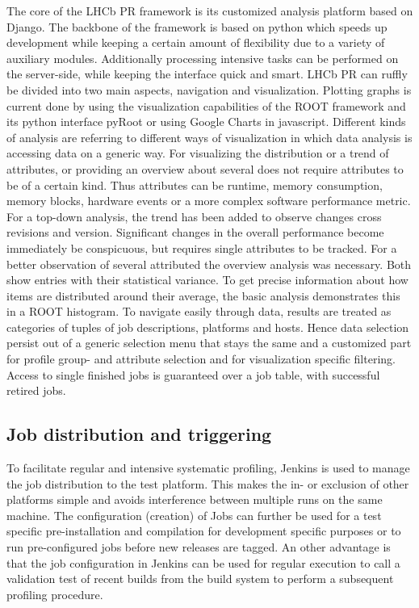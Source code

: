 \documentclass[a4paper]{jpconf}
\begin{document}
The core of the LHCb PR framework is its customized analysis platform based on Django. The backbone of the framework is based on python which speeds up development while keeping a certain amount of flexibility due to a variety of auxiliary modules. Additionally processing intensive tasks can be performed on the server-side, while keeping the interface quick and smart.
\newline
LHCb PR can ruffly be divided into two main aspects, navigation and visualization. Plotting graphs is current done by using the visualization capabilities of the ROOT framework and its python interface pyRoot or using Google Charts in javascript. Different kinds of analysis are referring to different ways of visualization in which data analysis is accessing data on a generic way. For visualizing the distribution or a trend of attributes, or providing an overview about several does not require attributes to be of a certain kind. Thus attributes can be runtime, memory consumption, memory blocks, hardware events or a more complex software performance metric.
\newline
For a top-down analysis, the trend has been added to observe changes cross revisions and version. Significant changes in the overall performance become immediately be conspicuous, but requires single attributes to be tracked. For a better observation of several attributed the overview analysis was necessary. Both show entries with their statistical variance. To get precise information about how items are distributed around their average, the basic analysis demonstrates this in a ROOT histogram.
\newline
To navigate easily through data, results are treated as categories of tuples of job descriptions, platforms and hosts. Hence data selection persist out of a generic selection menu that stays the same and a customized part for profile group- and attribute selection and for visualization specific filtering. Access to single finished jobs is guaranteed over a job table, with successful retired jobs.  

\subsection{Job distribution and triggering}
\label{sec:job_distribution}

To facilitate regular and intensive systematic profiling, Jenkins is used to manage the job distribution to the test platform. This makes the in- or exclusion of other platforms simple and avoids interference between multiple runs on the same machine. The configuration (creation) of Jobs can further be used for a test specific pre-installation and compilation for development specific purposes or to run pre-configured jobs before new releases are tagged.
\newline
An other advantage is that the job configuration in Jenkins can be used for regular execution to call a validation test of recent builds from the build system to perform a subsequent profiling procedure.  
\end{document}
